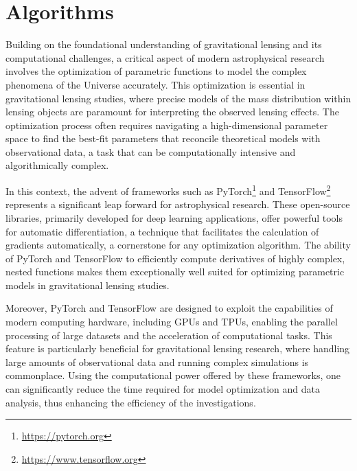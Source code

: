 \chapter[Algorithms]{Algorithms}
\label{chap:algorithms}

Building on the foundational understanding of gravitational lensing and its computational challenges, a critical aspect of modern astrophysical research involves the optimization of parametric functions to model the complex phenomena of the Universe accurately. This optimization is essential in gravitational lensing studies, where precise models of the mass distribution within lensing objects are paramount for interpreting the observed lensing effects. The optimization process often requires navigating a high-dimensional parameter space to find the best-fit parameters that reconcile theoretical models with observational data, a task that can be computationally intensive and algorithmically complex.

In this context, the advent of frameworks such as PyTorch\footnote{\url{https://pytorch.org}} \citep{paszke_pytorch_2019} and TensorFlow\footnote{\url{https://www.tensorflow.org}} \citep{abadi_tensorflow_2016} represents a significant leap forward for astrophysical research. These open-source libraries, primarily developed for deep learning applications, offer powerful tools for automatic differentiation, a technique that facilitates the calculation of gradients automatically, a cornerstone for any optimization algorithm. The ability of PyTorch and TensorFlow to efficiently compute derivatives of highly complex, nested functions makes them exceptionally well suited for optimizing parametric models in gravitational lensing studies.

Moreover, PyTorch and TensorFlow are designed to exploit the capabilities of modern computing hardware, including GPUs and TPUs, enabling the parallel processing of large datasets and the acceleration of computational tasks. This feature is particularly beneficial for gravitational lensing research, where handling large amounts of observational data and running complex simulations is commonplace. Using the computational power offered by these frameworks, one can significantly reduce the time required for model optimization and data analysis, thus enhancing the efficiency of the investigations.



